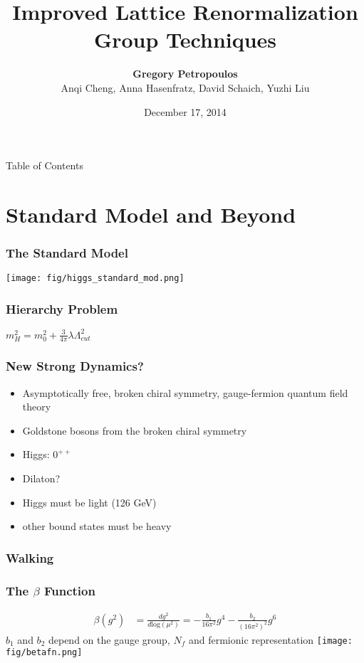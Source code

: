 \documentclass{beamer}
\title{\huge{Improved Lattice Renormalization Group Techniques}}
\author{\textbf{Gregory Petropoulos}\\ Anqi Cheng, Anna Hasenfratz, David Schaich, Yuzhi Liu}
\institute{University of Colorado Boulder}
\date{December 17, 2014}
\begin{document}
  {
    \begin{frame}
      \titlepage
    \end{frame}
  }
  \addtocounter{framenumber}{-1}

  \begin{frame}{Table of Contents}
    \tableofcontents
  \end{frame}
  \addtocounter{framenumber}{-1}


  \section{Standard Model and Beyond}
  \addtocounter{framenumber}{-1}

  \begin{frame}
    \frametitle{The Standard Model}
    \centering
    \texttt{[image: fig/higgs\_standard\_mod.png]}
  \end{frame}

  \begin{frame}
    \frametitle{Hierarchy Problem}
    \centering
    $m^2_H=m^2_0+\frac{3}{4\pi}\lambda\Lambda_{cut}^2$
  \end{frame}

  \begin{frame}
    \frametitle{New Strong Dynamics?}
    \begin{itemize}
      \item Asymptotically free, broken chiral symmetry, gauge-fermion quantum field theory
      \item Goldstone bosons from the broken chiral symmetry
      \item Higgs:  $0^{++}$
      \item Dilaton?
      \item Higgs must be light (126 GeV)
      \item other bound states must be heavy
    \end{itemize}
  \end{frame}

  \begin{frame}
    \frametitle{Walking}
    \centering
  \end{frame}

  \begin{frame}
    \frametitle{The $\beta$ Function}
    \centering
    \begin{align*}
      \beta(g^2)&=\frac{d g^2}{d\text{log}(\mu^2)}=-\frac{b_1}{16\pi^2}g^4-\frac{b_2}{(16\pi^2)^2}g^6
    \end{align*}
    \vspace{10pt}
    \tiny{$b_1$ and $b_2$ depend on the gauge group, $N_f$ and fermionic representation}
    \vspace{10pt}
    \centering
    \texttt{[image: fig/betafn.png]}
  \end{frame}
\end{document}
